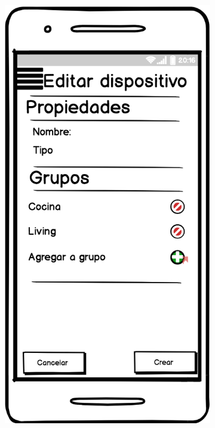 \begin{figure}[H]
\begin{subfigure}[b]{0.20\textwidth}
    \label{fig:balsamiq}
  \end{subfigure}
  \begin{subfigure}[b]{0.20\textwidth}
    \includegraphics[width=\textwidth, keepaspectratio]{images/balsamiq06}

\end{subfigure}
\end{figure}
